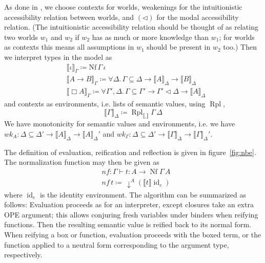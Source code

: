 \documentclass{article}
\begin{document}
As done in \cite{valliappan22}, we choose contexts for worlds,
weakenings for the intuitionistic accessibility relation between worlds, and
$(\lhd)$ for the modal accessibility relation.
(The intuitionistic accessibility relation should be thought of as
relating two worlds $w_1$ and $w_2$ if $w_2$ has as much or more knowledge than $w_1$;
for worlds as contexts this means all assumptions in $w_1$ should be present in $w_2$ too.)
Then we interpret types in the model as
\begin{align*}
  &\llbracket \iota \rrbracket_\Gamma \coloneqq \text{Nf} \, \Gamma \, \iota \\
  &\llbracket A \rightarrow B \rrbracket_\Gamma \coloneqq \forall \Delta. \, \Gamma \subseteq \Delta \rightarrow \llbracket A \rrbracket_\Delta \rightarrow \llbracket B \rrbracket_\Delta \\
  &\llbracket \Box A \rrbracket_\Gamma \coloneqq \forall \Gamma', \Delta. \, \Gamma \subseteq \Gamma' \rightarrow \Gamma'\lhd\Delta \rightarrow \llbracket A \rrbracket_\Delta
\end{align*}
and contexts as environments, i.e. lists of semantic values, using $\operatorname{Rpl}$,
$$ \llbracket \Gamma \rrbracket_\Delta \coloneqq \operatorname{Rpl}_{\llbracket\_\rrbracket} \Gamma \, \Delta $$
We have monotonicity for semantic values and environments,
i.e. we have
$wk_A : \Delta \subseteq \Delta' \rightarrow \llbracket A \rrbracket_\Delta \rightarrow \llbracket A \rrbracket_\Delta'$ and
$wk_\Gamma : \Delta \subseteq \Delta' \rightarrow \llbracket \Gamma \rrbracket_\Delta \rightarrow \llbracket \Gamma \rrbracket_\Delta'$.

The definition of evaluation, reification and reflection is given in figure~\ref{fig:nbe}.
The normalization function may then be given as
\begin{align*}
  &\textit{nf} : \Gamma \vdash t : A \rightarrow \operatorname{Nf} \Gamma \, A \\
  &\textit{nf} \, t \coloneqq \, \downarrow^A (\llbracket t \rrbracket \operatorname{id}_e)
\end{align*}
where $\operatorname{id}_e$ is the identity environment.
The algorithm can be summarized as follows:
Evaluation proceeds as for an interpreter,
except closures take an extra OPE argument;
this allows conjuring fresh variables under binders
when reifying functions.
Then the resulting semantic value is reified back to its normal form.
When reifying a box or function,
evaluation proceeds with the boxed term,
or the function applied to a neutral form corresponding to the argument type,
respectively.
\end{document}
